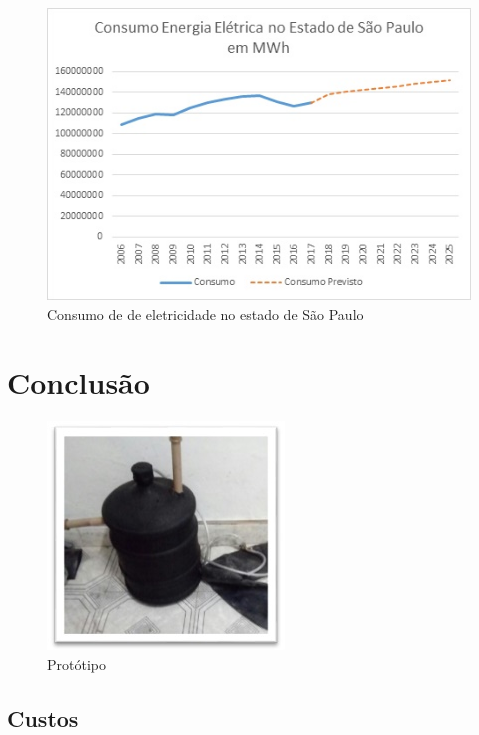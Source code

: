 \documentclass[
	12pt,		#fonte padrão 12pt
	oneside,
	a4paper,
	chapter=TITLE,
	english,
	brazil,
	hidelinks
]{abntex2}
\begin{document}
\begin{figure}[htb]
	\caption{\label{fig_grafico}Consumo de de eletricidade no estado de São Paulo}
	\begin{center}
	    \includegraphics[scale=1.0]{consumo_eletricidade_sp.jpg}
	\end{center}
\end{figure}

\chapter{Conclusão}

\blindtext

\begin{figure}[htb]
	\caption{\label{fig_grafico}Protótipo}
	\begin{center}
	    \includegraphics[scale=1.0]{Prototipo.jpg}
	\end{center}
\end{figure}

\section{Custos}

\Blindtext

\postextual


\end{document}
